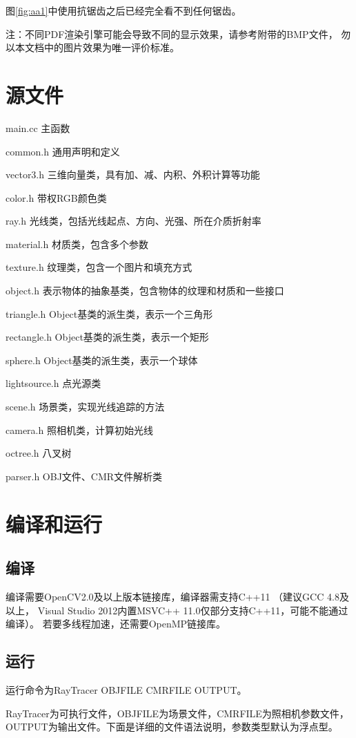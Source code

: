 图\ref{fig:aa1}中使用抗锯齿之后已经完全看不到任何锯齿。

注：不同PDF渲染引擎可能会导致不同的显示效果，请参考附带的BMP文件，%
勿以本文档中的图片效果为唯一评价标准。

\section{源文件}
main.cc 主函数

common.h 通用声明和定义

vector3.h 三维向量类，具有加、减、内积、外积计算等功能

color.h 带权RGB颜色类

ray.h 光线类，包括光线起点、方向、光强、所在介质折射率

material.h 材质类，包含多个参数

texture.h 纹理类，包含一个图片和填充方式

object.h 表示物体的抽象基类，包含物体的纹理和材质和一些接口

triangle.h Object基类的派生类，表示一个三角形

rectangle.h Object基类的派生类，表示一个矩形

sphere.h Object基类的派生类，表示一个球体

lightsource.h 点光源类

scene.h 场景类，实现光线追踪的方法

camera.h 照相机类，计算初始光线

octree.h 八叉树

parser.h OBJ文件、CMR文件解析类

\section{编译和运行}
\subsection{编译}
编译需要OpenCV2.0及以上版本链接库，编译器需支持C++11%
（建议GCC 4.8及以上，%
Visual Studio 2012内置MSVC++ 11.0仅部分支持C++11，可能不能通过编译）。%
若要多线程加速，还需要OpenMP链接库。

\subsection{运行}
运行命令为RayTracer OBJFILE CMRFILE OUTPUT。

RayTracer为可执行文件，OBJFILE为场景文件，CMRFILE为照相机参数文件，%
OUTPUT为输出文件。下面是详细的文件语法说明，参数类型默认为浮点型。

